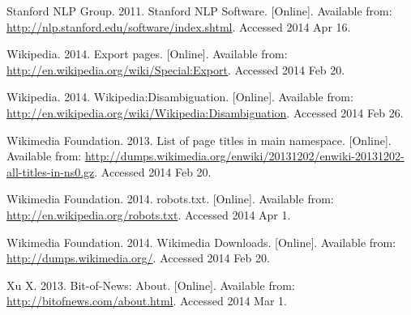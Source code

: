 \begin{thebibliography}{99}
Stanford NLP Group. 2011. Stanford NLP Software. [Online]. Available from: \url{http://nlp.stanford.edu/software/index.shtml}. Accessed 2014 Apr 16.

Wikipedia. 2014. Export pages. [Online]. Available from: \url{http://en.wikipedia.org/wiki/Special:Export}. Accessed 2014 Feb 20.

Wikipedia. 2014. Wikipedia:Disambiguation. [Online]. Available from: \url{http://en.wikipedia.org/wiki/Wikipedia:Disambiguation}. Accessed 2014 Feb 26.

Wikimedia Foundation. 2013. List of page titles in main namespace. [Online]. Available from: \url{http://dumps.wikimedia.org/enwiki/20131202/enwiki-20131202-all-titles-in-ns0.gz}. Accessed 2014 Feb 20.

Wikimedia Foundation. 2014. robots.txt. [Online]. Available from: \url{http://en.wikipedia.org/robots.txt}. Accessed 2014 Apr 1.

Wikimedia Foundation. 2014. Wikimedia Downloads. [Online]. Available from: \url{http://dumps.wikimedia.org/}. Accessed 2014 Feb 20.

Xu X. 2013. Bit-of-News: About. [Online]. Available from: \url{http://bitofnews.com/about.html}. Accessed 2014 Mar 1.

\end{thebibliography}